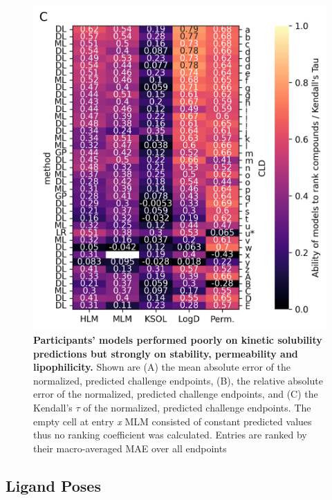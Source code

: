 \documentclass[journal=jcim,manuscript=article]{achemso}
\begin{document}
\begin{figure}
    \includegraphics[scale=0.6]{fig5_admet_leaderboard/Figure_PanelC.png}
  \caption{\textbf{Participants' models performed poorly on kinetic solubility predictions but strongly on stability, permeability and lipophilicity.} Shown are (A) the mean absolute error of the normalized, predicted challenge endpoints, (B), the relative absolute error of the normalized, predicted challenge endpoints, and (C) the Kendall's $\tau$ of the normalized, predicted challenge endpoints. The empty cell at entry \textit{x} MLM consisted of constant predicted values thus no ranking coefficient was calculated. Entries are ranked by their macro-averaged MAE over all endpoints}
  \label{fgr:heatmaps_admet}
\end{figure}

\subsection{Ligand Poses}
\end{document}
